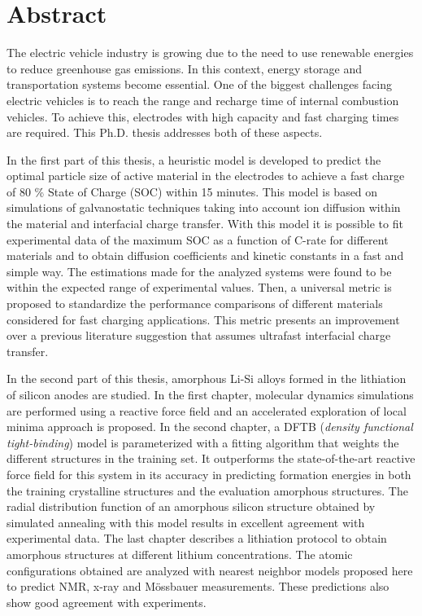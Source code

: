 \chapter{Abstract}

The electric vehicle industry is growing due to the need to use renewable 
energies to reduce greenhouse gas emissions. In this context, energy storage and 
transportation systems become essential. One of the biggest challenges facing 
electric vehicles is to reach the range and recharge time of internal combustion
vehicles. To achieve this, electrodes with high capacity and fast charging times 
are required. This Ph.D. thesis addresses both of these aspects.

In the first part of this thesis, a heuristic model is developed to predict the 
optimal particle size of active material in the electrodes to achieve a fast 
charge of 80 \% State of Charge (SOC) within 15 minutes. This model is based on 
simulations of galvanostatic techniques taking into account ion diffusion within 
the material and interfacial charge transfer. With this model it is possible to 
fit experimental data of the maximum SOC as a function of C-rate for different 
materials and to obtain diffusion coefficients and kinetic constants in a fast 
and simple way. The estimations made for the analyzed systems were found to be 
within the expected range of experimental values. Then, a universal metric is 
proposed to standardize the performance comparisons of different materials 
considered for fast charging applications. This metric presents an improvement 
over a previous literature suggestion that assumes ultrafast interfacial charge 
transfer.

In the second part of this thesis, amorphous Li-Si alloys formed in the 
lithiation of silicon anodes are studied. In the first chapter, molecular 
dynamics simulations are performed using a reactive force field and an accelerated 
exploration of local minima approach is proposed. In the second chapter, a DFTB 
(\textit{density functional tight-binding}) model is parameterized with a fitting 
algorithm that weights the different structures in the training set. It
outperforms the state-of-the-art reactive force field for this system in its 
accuracy in predicting formation energies in both the training crystalline 
structures and the evaluation amorphous structures. The radial distribution 
function of an amorphous silicon structure obtained by simulated annealing with 
this model results in excellent agreement with experimental data. The last 
chapter describes a lithiation protocol to obtain amorphous structures at 
different lithium concentrations. The atomic configurations obtained are analyzed 
with nearest neighbor models proposed here to predict NMR, x-ray and Mössbauer 
measurements. These predictions also show good agreement with experiments.
